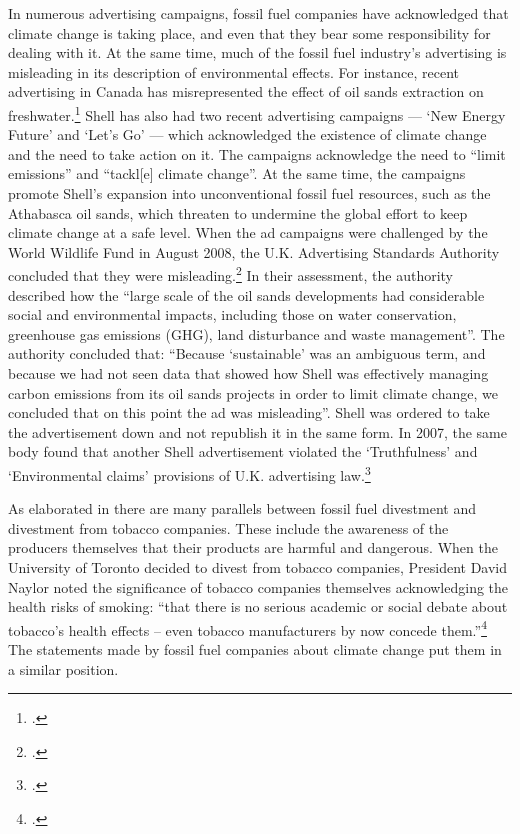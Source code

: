 \documentclass[10pt]{article}
\begin{document}
In numerous advertising campaigns, fossil fuel companies have acknowledged that climate change is taking place, and even that they bear some responsibility for dealing with it.
At the same time, much of the fossil fuel industry's advertising is misleading in its description of environmental effects.
For instance, recent advertising in Canada has misrepresented the effect of oil sands extraction on freshwater.\footcite[][]{PembinaOilAds}
Shell has also had two recent advertising campaigns --- `New Energy Future' and `Let's Go' --- which acknowledged the existence of climate change and the need to take action on it.
The campaigns acknowledge the need to ``limit  emissions'' and ``tackl[e] climate change''.
At the same time, the campaigns promote Shell's expansion into unconventional fossil fuel resources, such as the Athabasca oil sands, which threaten to undermine the global effort to keep climate change at a safe level.
When the ad campaigns were challenged by the World Wildlife Fund in August 2008, the U.K. Advertising Standards Authority concluded that they were misleading.\footcite[][]{ASAversusShell2008}
In their assessment, the authority described how the ``large scale of the oil sands developments had considerable social and environmental impacts, including those on water conservation, greenhouse gas emissions (GHG), land disturbance and waste management''.
The authority concluded that: ``Because `sustainable' was an ambiguous term, and because we had not seen data that showed how Shell was effectively managing carbon emissions from its oil sands projects in order to limit climate change, we concluded that on this point the ad was misleading''.
Shell was ordered to take the advertisement down and not republish it in the same form.
In 2007, the same body found that another Shell advertisement violated the `Truthfulness' and `Environmental claims' provisions of U.K. advertising law.\footcite[][]{ASAversusShell2007}



As elaborated in  there are many parallels between fossil fuel divestment and divestment from tobacco companies.
These include the awareness of the producers themselves that their products are harmful and dangerous.
When the University of Toronto decided to divest from tobacco companies, President David Naylor noted the significance of tobacco companies themselves acknowledging the health risks of smoking: ``that there is no serious academic or social debate about tobacco's health effects – even tobacco manufacturers by now concede them.''\footcite[][]{TStarSellOff}
The statements made by fossil fuel companies about climate change put them in a similar position.
\end{document}
